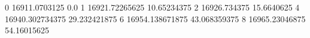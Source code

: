 0 16911.0703125 0.0
1 16921.72265625 10.65234375
2 16926.734375 15.6640625
4 16940.302734375 29.232421875
6 16954.138671875 43.068359375
8 16965.23046875 54.16015625
